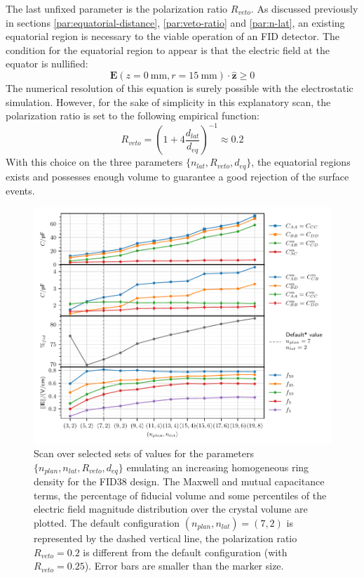 The last unfixed parameter is the polarization ratio $R_{veto}$. As discussed previously in sections \ref{par:equatorial-distance}, \ref{par:veto-ratio} and \ref{par:n-lat}, an existing equatorial region is necessary to the viable operation of an FID detector. The condition for the equatorial region to appear is that the electric field at the equator is nullified:
\begin{equation}
\bm{E}\left(z=\SI{0}{\mm}, r=\SI{15}{\mm} \right) \cdot \hat{\bm{z}} \geq 0
\end{equation}
The numerical resolution of this equation is surely possible with the electrostatic simulation. However, for the sake of simplicity in this explanatory scan, the polarization ratio is set to the following empirical function:
\begin{equation}
R_{veto} = \left(1 + 4 \frac{d_{lat}}{d_{eq}} \right)^{-1} \approx 0.2
\end{equation}
With this choice on the three parameters $\{n_{lat}, R_{veto}, d_{eq}\}$, the equatorial regions exists and possesses enough volume to guarantee a good rejection of the surface events.

\begin{figure}
\centering
\includegraphics[scale=1]{Figures/ElectrodesScan/capacitance_fiducial_global_scale.pdf}
\caption{Scan over selected sets of values for the parameters $\{n_{plan}, n_{lat}, R_{veto}, d_{eq}\}$ emulating an increasing homogeneous ring density for the FID38 design. The Maxwell and mutual capacitance terms, the percentage of fiducial volume and some percentiles of the electric field magnitude distribution over the crystal volume are plotted. The default configuration $(n_{plan}, n_{lat})=(7,2)$ is represented by the dashed vertical line, the polarization ratio $R_{veto}=0.2$ is different from the default configuration (with $R_{veto}=0.25$). Error bars are smaller than the marker size.}
\label{fig:capacitance-fiducial-global-scale}
\end{figure}

